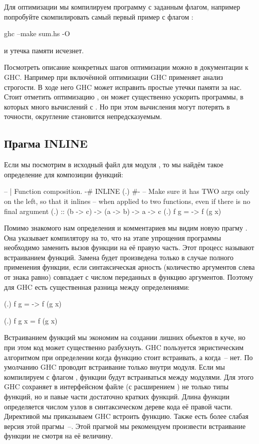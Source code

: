 Для оптимизации мы компилируем программу с заданным флагом,
например попробуйте скомпилировать самый первый пример
с флагом :

\begin{code}
ghc --make sum.hs -O 
\end{code}
  
\noindent и утечка памяти исчезнет.

Посмотреть описание конкретных шагов оптимизации можно
в документации к GHC. Например при включённой оптимизации 
GHC применяет анализ строгости. В ходе него GHC может
исправить простые утечки памяти за нас. Стоит отметить
оптимизацию , он может существенно
ускорить программы, в которых много вычислений с .
Но при этом вычисления могут потерять в точности, 
округление становится непредсказуемым.

\subsection{Прагма INLINE}

Если мы посмотрим в исходный файл для модуля ,
то мы найдём такое определение для композиции функций:

\begin{code}
-- | Function composition.
{-# INLINE (.) #-}
-- Make sure it has TWO args only on the left, so that it inlines
-- when applied to two functions, even if there is no final argument
(.)    :: (b -> c) -> (a -> b) -> a -> c
(.) f g = \x -> f (g x)
\end{code}
  
Помимо знакомого нам определения и комментариев мы
видим новую прагму . Она указывает компилятору
на то, что на этапе упрощения программы необходимо
заменить вызов функции на её правую часть.
Этот процесс называют встраиванием функций.
Замена будет произведена только в случае 
полного применения функции, если синтаксическая арность
(количество аргументов слева от знака равно) совпадает
с числом переданных в функцию аргументов. Поэтому для
GHC есть существенная разница между определениями:

\begin{code}
(.) f g = \x -> f (g x)

(.) f g x = f (g x)
\end{code}
  
Встраиванием функций мы экономим на создании лишних
объектов в куче, но при этом код может существенно
разбухнуть. GHC пользуется эвристическим алгоритмом
при определении когда функцию стоит встраивать,
а когда~-- нет. По умолчанию GHC проводит встраивание
только внутри модуля. Если мы компилируем с флагом ,
функции будут встраиваться между модулями. Для этого
GHC сохраняет в интерфейсном файле (с расширением )
не только типы функций, но и павые части достаточно
кратких функций. Длина функции определяется числом 
узлов в синтаксическом дереве кода её правой части. 
Директивой  мы приказываем GHC встроить функцию.
Также есть более слабая версия этой прагмы~--. 
Этой прагмой мы  рекомендуем произвести встраивание 
функции не смотря на её величину.

